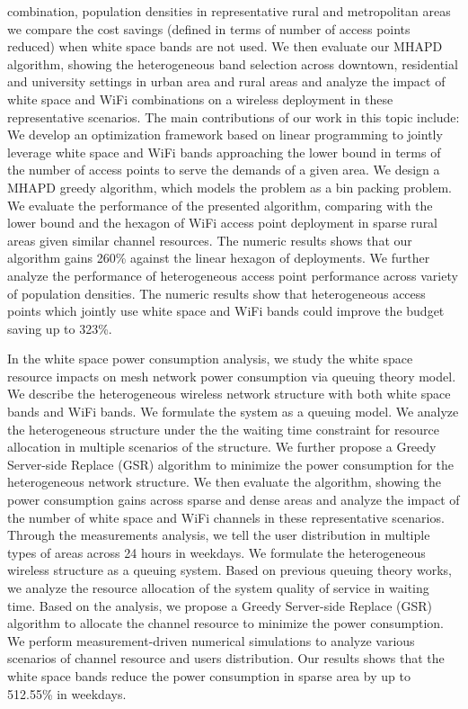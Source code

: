 combination, population densities in representative rural and metropolitan 
areas we compare the cost savings (defined in terms of number of access 
points reduced) when white space bands are not used. We then evaluate our 
MHAPD algorithm, showing the heterogeneous band selection across downtown, 
residential and university settings in urban area and rural areas and analyze 
the impact of white space and WiFi combinations on a wireless deployment in 
these representative scenarios.
The main contributions of our work in this topic include: We develop an 
optimization framework based on linear programming to jointly leverage 
white space and WiFi bands approaching the lower bound in terms of the number 
of access points to serve the demands of a given area. We design a MHAPD 
greedy algorithm, which models the problem as a bin packing problem. We 
evaluate the performance of the presented algorithm, comparing with the 
lower bound and the hexagon of WiFi access point deployment in sparse rural 
areas given similar channel resources. The numeric results shows that our 
algorithm gains 260\% against the linear hexagon of deployments.  We 
further analyze the performance of heterogeneous access point performance 
across variety of population densities. The numeric results show that heterogeneous 
access points which jointly use white space and WiFi bands could improve 
the budget saving up to 323\%. 

In the white space power consumption analysis, we study the white space resource impacts on 
mesh network power consumption via queuing theory model.
We describe the heterogeneous wireless network structure with both white space bands and WiFi bands. 
We formulate the system as a queuing model. We analyze the heterogeneous structure under the the waiting 
time constraint for resource allocation in multiple scenarios of the structure. We further propose a Greedy 
Server-side Replace (GSR) algorithm to minimize the power consumption for the heterogeneous network structure. 
We then evaluate the algorithm, showing the power consumption gains across sparse and dense areas and 
analyze the impact of the number of white space and WiFi channels in these representative scenarios.
Through the measurements analysis, we tell the user distribution in multiple types of areas across 24 hours in weekdays. 
We formulate the heterogeneous wireless structure as a queuing system. Based on previous queuing theory works, we 
analyze the resource allocation of the system quality of service in waiting time. Based on the analysis, we propose a 
Greedy Server-side Replace (GSR) algorithm to allocate the channel resource to minimize the power consumption.
We perform measurement-driven numerical simulations to analyze various scenarios of channel resource and 
users distribution. Our results shows that the white space bands reduce the power consumption in
sparse area by up to 512.55\% in weekdays.


